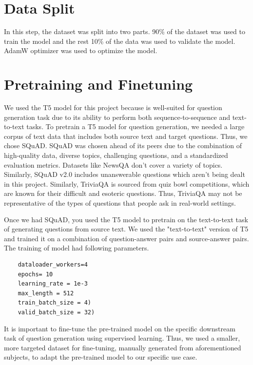 \documentclass[12pt]{report}
\begin{document}
\section{Data Split}
In this step, the dataset was split into two parts. 90\% of the dataset was used to train the model and the rest 10\% of the data was used to validate the model. AdamW optimizer was used to optimize the model.  
\section{Pretraining and Finetuning}
We used the T5 model for this project because is well-suited for question generation task due to its ability to perform both sequence-to-sequence and text-to-text tasks.
To pretrain a T5 model for question generation, we needed a large corpus of text data that includes both source text and target questions. Thus, we chose SQuAD. SQuAD was chosen ahead of its peers due to the combination of high-quality data, diverse topics, challenging questions, and a standardized evaluation metrics. Datasets like NewsQA don't cover a variety of topics. Similarly, SQuAD v2.0 includes unanswerable questions which aren't being dealt in this project. Similarly, TriviaQA is sourced from quiz bowl competitions, which are known for their difficult and esoteric questions. Thus, TriviaQA may not be representative of the types of questions that people ask in real-world settings.

Once we had SQuAD, you used the T5 model to pretrain on the text-to-text task of generating questions from source text. We used the "text-to-text" version of T5 and trained it on a combination of question-answer pairs and source-answer pairs. 
The training of model had following parameters.
\begin{verbatim}
    dataloader_workers=4
    epochs= 10
    learning_rate = 1e-3
    max_length = 512
    train_batch_size = 4)
    valid_batch_size = 32)
\end{verbatim}
It is important to fine-tune the pre-trained model on the specific downstream task of question generation using supervised learning. Thus, we used a smaller, more targeted dataset for fine-tuning, manually generated from aforementioned subjects, to adapt the pre-trained model to our specific use case.
\end{document}
